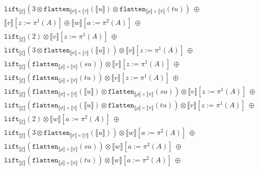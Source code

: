 \documentclass[a4paper,UKenglish,cleveref,autoref,numberwithinsect]{lipics-v2019}
\theoremstyle{definition}
\newcommand{\flatten}{\mathtt{flatten}}
\newcommand{\lift}{\mathtt{lift}}
\newcommand{\typeinterpret}[1]{\llbracket #1 \rrbracket}
\newcommand{\interpret}[1]{\llbracket #1 \rrbracket}
\begin{document}
\begin{itemize}
\[\begin{array}{l}
  \phantom{A}
    \lift_{\typeinterpret{\xi}}(3 \otimes \flatten_{\typeinterpret{\sigma}
    \times \typeinterpret{\tau}}(\interpret{u}) \otimes
    \flatten_{\typeinterpret{\rho} \times \typeinterpret{\pi}}(tu))\ 
    \oplus \\
  \phantom{A}
    \interpret{v}[z:=\pi^1(A)] \oplus
    \interpret{w}[a:=\pi^2(A)]\ \oplus\ \\
  \phantom{A}
    \lift_{\typeinterpret{\xi}}(2) \otimes
     \interpret{v}[z:=\pi^1(A)]
    \ \oplus \\
  \phantom{A}
    \lift_{\typeinterpret{\xi}}(3 \otimes
    \flatten_{\typeinterpret{\sigma} \times \typeinterpret{\tau}}(
    \interpret{u})) \otimes
     \interpret{v}[z:=\pi^1(A)]
    \ \oplus \\
  \phantom{A}
    \lift_{\typeinterpret{\xi}}(\flatten_{\typeinterpret{\rho} \times
    \typeinterpret{\pi}}(su)) \otimes
     \interpret{v}[z:=\pi^1(A)]
    \ \oplus\\
  \phantom{A}
    \lift_{\typeinterpret{\xi}}(\flatten_{\typeinterpret{\rho} \times
    \typeinterpret{\pi}}(tu)) \otimes
     \interpret{v}[z:=\pi^1(A)]
    \ \oplus \\
  \phantom{A}
    \lift_{\typeinterpret{\xi}}(\flatten_{\typeinterpret{\sigma} \times
    \typeinterpret{\tau}}(\interpret{u}) \otimes
    \flatten_{\typeinterpret{\rho} \times \typeinterpret{\pi}}(su))
    \otimes
     \interpret{v}[z:=\pi^1(A)]
    \ \oplus \\
  \phantom{A}
    \lift_{\typeinterpret{\xi}}(\flatten_{\typeinterpret{\sigma} \times
    \typeinterpret{\tau}}(\interpret{u}) \otimes
    \flatten_{\typeinterpret{\rho} \times \typeinterpret{\pi}}(tu))
    \otimes
     \interpret{v}[z:=\pi^1(A)]
    \ \oplus \\
  \phantom{A}
    \lift_{\typeinterpret{\xi}}(2) \otimes
    \interpret{w}[a:=\pi^2(A)]
    \ \oplus \\
  \phantom{A}
    \lift_{\typeinterpret{\xi}}(3 \otimes
    \flatten_{\typeinterpret{\sigma} \times \typeinterpret{\tau}}(
    \interpret{u})) \otimes
    \interpret{w}[a:=\pi^2(A)]
    \ \oplus \\
  \phantom{A}
    \lift_{\typeinterpret{\xi}}(\flatten_{\typeinterpret{\rho} \times
    \typeinterpret{\pi}}(su)) \otimes
    \interpret{w}[a:=\pi^2(A)]
    \ \oplus\\
  \phantom{A}
    \lift_{\typeinterpret{\xi}}(\flatten_{\typeinterpret{\rho} \times
    \typeinterpret{\pi}}(tu)) \otimes
    \interpret{w}[a:=\pi^2(A)]
    \ \oplus \\

\end{array}\]
\end{itemize}
\end{document}
